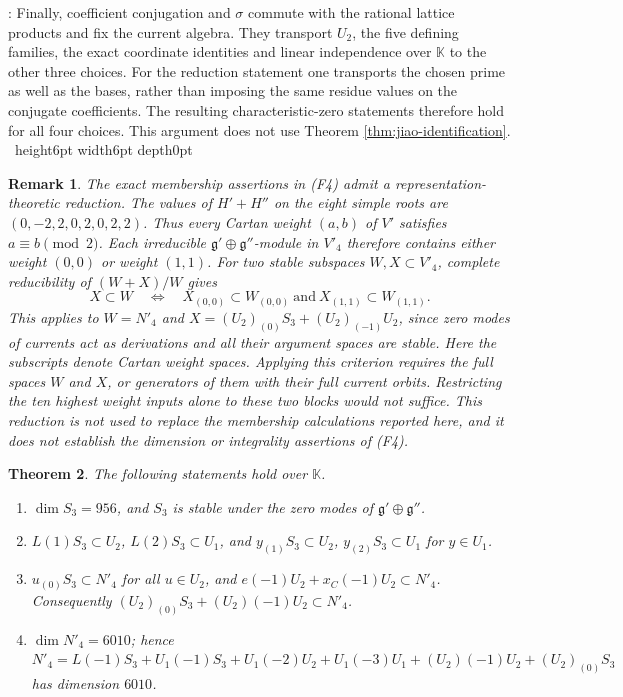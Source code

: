 \documentclass[leqno]{article}
\newcommand{\K}{\ensuremath{\mathbb{K}}}
\newcommand{\qed}{\hfill \vrule height6pt  width6pt depth0pt}
\newtheorem{thm}{Theorem}[section]
\newtheorem{remark}[thm]{Remark}
\newenvironment{proof}[1][]{\noindent {\it Proof #1} : }{\hbox{~}\qed
\smallskip
}
\numberwithin{equation}{section}
\begin{document}
\begin{proof}
Finally, coefficient conjugation and $\sigma$ commute with the rational lattice products and fix the current algebra. They transport $U_2$, the five defining families, the exact coordinate identities and linear independence over $\K$ to the other three choices. For the reduction statement one transports the chosen prime as well as the bases, rather than imposing the same residue values on the conjugate coefficients. The resulting characteristic-zero statements therefore hold for all four choices. This argument does not use Theorem \ref{thm:jiao-identification}.
\end{proof}

\begin{remark} \normalfont
\label{rem:two-cartan-blocks}
The exact membership assertions in \textup{(F4)} admit a representation-theoretic reduction. The values of $H'+H''$ on the eight simple roots are $(0,-2,2,0,2,0,2,2)$. Thus every Cartan weight $(a,b)$ of $V'$ satisfies $a \equiv b \pmod 2$. Each irreducible $\mathfrak g' \oplus \mathfrak g''$-module in $V'_4$ therefore contains either weight $(0,0)$ or weight $(1,1)$. For two stable subspaces $W,X \subset V'_4$, complete reducibility of $(W+X)/W$ gives
\[
X \subset W \quad\Longleftrightarrow\quad X_{(0,0)} \subset W_{(0,0)} \ \text{and}\ X_{(1,1)} \subset W_{(1,1)}.
\]
This applies to $W = N'_4$ and $X = (U_2)_{(0)}S_3+(U_2)_{(-1)}U_2$, since zero modes of currents act as derivations and all their argument spaces are stable. Here the subscripts denote Cartan weight spaces. Applying this criterion requires the full spaces $W$ and $X$, or generators of them with their full current orbits. Restricting the ten highest weight inputs alone to these two blocks would not suffice. This reduction is not used to replace the membership calculations reported here, and it does not establish the dimension or integrality assertions of \textup{(F4)}.
\end{remark}

\begin{thm}
\label{thm:exact-weight-three}
The following statements hold over $\K$.
\begin{enumerate}
\item $\dim S_3 = 956$, and $S_3$ is stable under the zero modes of $\mathfrak g' \oplus \mathfrak g''$.
\item $L(1)S_3 \subset U_2$, $L(2)S_3 \subset U_1$, and $y_{(1)}S_3 \subset U_2$, $y_{(2)}S_3 \subset U_1$ for $y \in U_1$.
\item $u_{(0)}S_3 \subset N'_4$ for all $u \in U_2$, and $e(-1)U_2 + x_C(-1)U_2 \subset N'_4$. Consequently $(U_2)_{(0)}S_3 + (U_2)(-1)U_2 \subset N'_4$.
\item $\dim N'_4 = 6010$; hence $N'_4 = L(-1)S_3 + U_1(-1)S_3 + U_1(-2)U_2 + U_1(-3)U_1 + (U_2)(-1)U_2 + (U_2)_{(0)}S_3$ has dimension $6010$.
\end{enumerate}
\end{thm}
\end{document}

